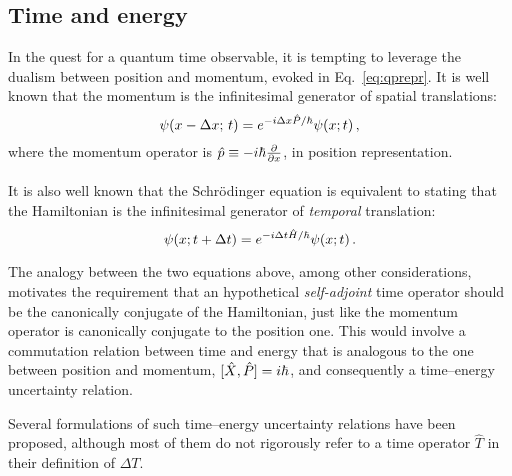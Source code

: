 \subsection{Time and energy}\label{sec:T--H}

In the quest for a quantum time observable,
it is tempting to leverage
the dualism between position and momentum,
evoked in Eq.~\eqref{eq:qprepr}.
It is well known that the momentum is the infinitesimal generator of spatial translations:
\begin{equation}\label{eq:genspacetransl}
  \psi(x-\Delta x; \, t) = e^{-i \Delta x \hat{P} / \hbar} \psi(x; t) \,\text{,}
\end{equation}
where the momentum operator is $\hat{p} \underset{}{\equiv} -i\hbar \pdv{x}$, in position representation.

It is also well known that the Schr\"odinger equation is equivalent to
stating that the Hamiltonian is the infinitesimal generator of
\emph{temporal} translation:
\begin{equation}\label{eq:gentimetransl}
  \psi(x; t+\Delta t) = e^{-i \Delta t \hat{H} / \hbar} \psi(x; t) \,\text{.}
\end{equation}

The analogy between the two equations above,
among other considerations,
motivates the requirement that
an hypothetical \emph{self-adjoint} time operator should be the canonically conjugate of the Hamiltonian,
just like the momentum operator is canonically conjugate to the position one.
This would involve
a commutation relation between time and energy that is analogous to
the one between position and momentum, $[\hat{X}, \hat{P}] = i \hbar$,
and consequently a time--energy uncertainty relation.

Several formulations of such time--energy uncertainty relations have been proposed,
although most of them do not rigorously refer to
a time operator $\hat{T}$ in their definition of $\Delta T$.

